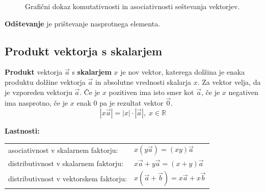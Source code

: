 \documentclass[a4paper,oneside,12pt,fleqn]{article}
\def\R{\ensuremath{\mathbb R}}
\newcommand\krat\cdot
\newcommand{\beforecaptionskip}{\vspace{-12pt}}
\numberwithin{equation}{section}
\begin{document}
\begin{figure}[ht]
   \begin{center}
  \end{center}
  \beforecaptionskip
  \caption{Grafični dokaz komutativnosti in asociativnosti seštevanja vektorjev.}
  \label{fig:vec:sest:zak}
\end{figure}

\textbf{Odštevanje} je prištevanje nasprotnega elementa.

\subsection{Produkt vektorja s skalarjem}
\label{sec:vec:vecskal}
\textbf{Produkt} vektorja $\vec{a}$ s \textbf{skalarjem} $x$ je nov vektor, katerega dolžina je enaka
produktu dolžine vektorja $\vec{a}$ in absolutne vrednosti skalarja $x$. Za vektor velja,
da je vzporeden vektorju $\vec{a}$. Če je $x$ pozitiven ima isto smer kot $\vec{a}$, če je
$x$ negativen ima nasprotno, če je $x$ enak 0 pa je rezultat vektor $\vec{0}$.
\[ \left| x\vec{a} \right| = \left| x \right| \krat \left| \vec{a} \right|, \; x \in \R \] 

\textbf{Lastnosti:}\\[6pt]
\begin{tabular}[h!]{ll}
  asociativnost v skalarnem faktorju:    & $x(y\vec{a}) = (xy)\vec{a}$ \\
  distributivnost v skalarnem faktorju:  & $x\vec{a} + y\vec{a} = (x+y)\vec{a}$ \\
  distributivnost v vektorskem faktorju: & $x(\vec{a} + \vec{b}) = x\vec{a} + x\vec{b}$
\end{tabular}
\end{document}
